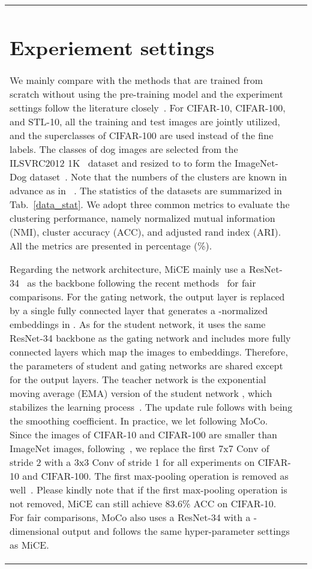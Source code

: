 \documentclass{article} \usepackage{iclr2021_conference,times}
\begin{document}
\begin{table}[t]
\begin{subtable}[h]{0.49\textwidth}
{\begin{tabular}{@{}lc@{}}
\section{Experiement settings}\label{sec:detail_exp}


We mainly compare with the methods that are trained from scratch without using the pre-training model and the experiment settings follow the literature closely~\citep{chang2017deep,wu2019deep,ji2019invariant,shiran2019multi,darlow2020dhog}.
For CIFAR-10, CIFAR-100, and STL-10, all the training and test images are jointly utilized, and the  superclasses of CIFAR-100 are used instead of the fine labels. The  classes of dog images are selected from the ILSVRC2012 1K~\citep{deng2009imagenet} dataset and resized to  to form the ImageNet-Dog dataset~\citep{chang2017deep,wu2019deep}. Note that the numbers of the clusters are known in advance as in ~\citet{chang2017deep,ji2019invariant,wu2019deep,shiran2019multi}. The statistics of the datasets are summarized in Tab.~\ref{data_stat}. We adopt three common metrics to evaluate the clustering performance, namely normalized mutual information (NMI), cluster accuracy (ACC), and adjusted rand index (ARI). All the metrics are presented in percentage (\%).   




Regarding the network architecture, MiCE mainly use a ResNet-34~\citep{he2016deep} as the backbone following the recent methods~\citep{ji2019invariant,shiran2019multi} for fair comparisons. For the gating network, the output layer is replaced by a single fully connected layer that generates a -normalized embeddings in . As for the student network, it uses the same ResNet-34 backbone as the gating network and includes  more fully connected layers which map the images to  embeddings. Therefore, the parameters of student and gating networks are shared except for the output layers. The teacher network  is the exponential moving average (EMA) version of the student network , which stabilizes the learning process~\citep{he2019momentum,tarvainen2017mean}. The update rule follows  with  being the smoothing coefficient. In practice, we let  following MoCo. Since the images of CIFAR-10 and CIFAR-100 are smaller than ImageNet images, following~\citep{chen2020simple}, we replace the first 7x7 Conv of stride 2 with a 3x3 Conv of stride 1 for all experiments on CIFAR-10 and CIFAR-100. The first max-pooling operation is removed as well~\citep{wu2018unsupervised,chen2020simple,ye2019unsupervised}. Please kindly note that if the first max-pooling operation is not removed, MiCE can still achieve 83.6\% ACC on CIFAR-10. For fair comparisons, MoCo also uses a ResNet-34 with a -dimensional output and follows the same hyper-parameter settings as MiCE.


\end{tabular}}
\end{subtable}
\end{table}
\end{document}
